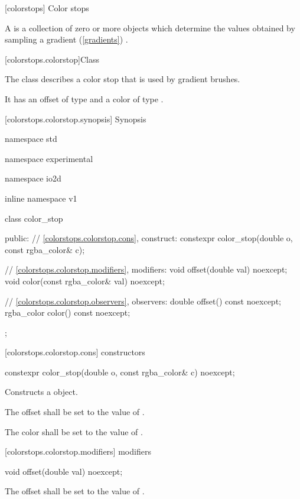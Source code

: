  [colorstops] {Color stops}

\pnum
A  is a collection of zero or more  objects which determine the values obtained by sampling a gradient (\ref{gradients}) .

 [colorstops.colorstop]{Class }

\pnum
{}
The class  describes a color stop that is used by gradient brushes.

\pnum
It has an offset of type  and a color of type .

 [colorstops.colorstop.synopsis] { Synopsis}

\begin{codeblock}
namespace std { namespace experimental { namespace io2d { inline namespace v1 {
  class color_stop {
  public:
  	// \ref{colorstops.colorstop.cons}, construct:
    constexpr color_stop(double o, const rgba_color& c);
    
    // \ref{colorstops.colorstop.modifiers}, modifiers:
    void offset(double val) noexcept;
	void color(const rgba_color& val) noexcept;
	
    // \ref{colorstops.colorstop.observers}, observers:
	double offset() const noexcept;
	rgba_color color() const noexcept;
  };
} } } }
\end{codeblock}

 [colorstops.colorstop.cons]{ constructors}

\begin{itemdecl}
	constexpr color_stop(double o, const rgba_color& c) noexcept;
\end{itemdecl}
\begin{itemdescr}
	\pnum
	\effects
	Constructs a  object.
	
	\pnum
	The offset shall be set to the value of .
	
	\pnum
	The color shall be set to the value of .
\end{itemdescr}

 [colorstops.colorstop.modifiers]{ modifiers}

\begin{itemdecl}
	void offset(double val) noexcept;
\end{itemdecl}
\begin{itemdescr}
	\pnum
	\effects
	The offset shall be set to the value of .
\end{itemdescr}

